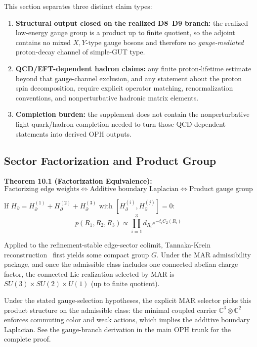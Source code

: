 This section separates three distinct claim types:
\begin{enumerate}
\item \textbf{Structural output closed on the realized D8--D9 branch:} the realized low-energy gauge group is a product up to finite quotient, so the adjoint contains no mixed \(X,Y\)-type gauge bosons and therefore no \emph{gauge-mediated} proton-decay channel of simple-GUT type.
\item \textbf{QCD/EFT-dependent hadron claims:} any finite proton-lifetime estimate beyond that gauge-channel exclusion, and any statement about the proton spin decomposition, require explicit operator matching, renormalization conventions, and nonperturbative hadronic matrix elements.
\item \textbf{Completion burden:} the supplement does not contain the nonperturbative light-quark/hadron completion needed to turn those QCD-dependent statements into derived OPH outputs.
\end{enumerate}

\subsection{Sector Factorization and Product Group}\label{101-sector-factorization-and-product-group}

\textbf{Theorem 10.1 (Factorization Equivalence):} \[\text{Factorizing edge weights} \Leftrightarrow \text{Additive boundary Laplacian} \Leftrightarrow \text{Product gauge group}\]

If \(H_\partial = H_\partial^{(1)} + H_\partial^{(2)} + H_\partial^{(3)}\) with \([H_\partial^{(i)}, H_\partial^{(j)}] = 0\): \[p(R_1, R_2, R_3) \propto \prod_{i=1}^3 d_{R_i} e^{-t_i C_2(R_i)}\]

Applied to the refinement-stable edge-sector colimit, Tannaka-Krein reconstruction~\cite{tannaka38,krein49,dr89,dr90} first yields some compact group \(G\). Under the MAR admissibility package, and once the admissible class includes one connected abelian charge factor, the connected Lie realization selected by MAR is \(SU(3) \times SU(2) \times U(1)\) (up to finite quotient).

Under the stated gauge-selection hypotheses, the explicit MAR selector picks this product structure on the admissible class: the minimal coupled carrier \(\mathbb{C}^3 \otimes \mathbb{C}^2\) enforces commuting color and weak actions, which implies the additive boundary Laplacian. See the gauge-branch derivation in the main OPH trunk for the complete proof.

